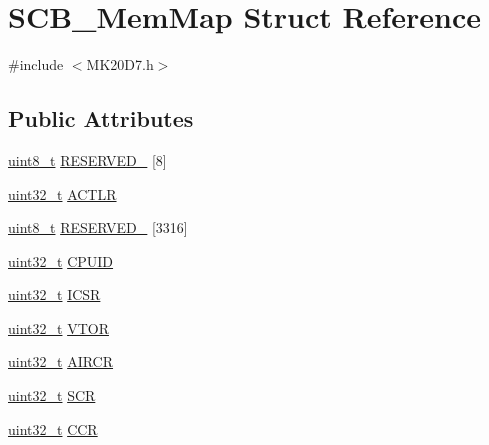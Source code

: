 \hypertarget{struct_s_c_b___mem_map}{}\section{S\+C\+B\+\_\+\+Mem\+Map Struct Reference}
\label{struct_s_c_b___mem_map}


{\ttfamily \#include $<$M\+K20\+D7.\+h$>$}

\subsection*{Public Attributes}
\begin{DoxyCompactItemize}
\item 
\hyperlink{_p_e___types_8h_aba7bc1797add20fe3efdf37ced1182c5}{uint8\+\_\+t} \hyperlink{struct_s_c_b___mem_map_af7bf3148523b4393be4bbefcfca42536}{R\+E\+S\+E\+R\+V\+E\+D\+\_} \mbox{[}8\mbox{]}
\item 
\hyperlink{_p_e___types_8h_a33594304e786b158f3fb30289278f5af}{uint32\+\_\+t} \hyperlink{struct_s_c_b___mem_map_a474a33074611146734690e48ed41282e}{A\+C\+T\+LR}
\item 
\hyperlink{_p_e___types_8h_aba7bc1797add20fe3efdf37ced1182c5}{uint8\+\_\+t} \hyperlink{struct_s_c_b___mem_map_a43cc7c47828036be100191e7ebd7115b}{R\+E\+S\+E\+R\+V\+E\+D\+\_} \mbox{[}3316\mbox{]}
\item 
\hyperlink{_p_e___types_8h_a33594304e786b158f3fb30289278f5af}{uint32\+\_\+t} \hyperlink{struct_s_c_b___mem_map_ad020795dcc3605b4c828af83df8b8836}{C\+P\+U\+ID}
\item 
\hyperlink{_p_e___types_8h_a33594304e786b158f3fb30289278f5af}{uint32\+\_\+t} \hyperlink{struct_s_c_b___mem_map_aafbaa0d0a4b79969877c9b84be8aaf7a}{I\+C\+SR}
\item 
\hyperlink{_p_e___types_8h_a33594304e786b158f3fb30289278f5af}{uint32\+\_\+t} \hyperlink{struct_s_c_b___mem_map_aa327db1d9948595498fba43acc8d336b}{V\+T\+OR}
\item 
\hyperlink{_p_e___types_8h_a33594304e786b158f3fb30289278f5af}{uint32\+\_\+t} \hyperlink{struct_s_c_b___mem_map_a3f874ca1c6e17ae4beadac22e8ec17ec}{A\+I\+R\+CR}
\item 
\hyperlink{_p_e___types_8h_a33594304e786b158f3fb30289278f5af}{uint32\+\_\+t} \hyperlink{struct_s_c_b___mem_map_ac8d0a0d974bde944d42429065dd2f44a}{S\+CR}
\item 
\hyperlink{_p_e___types_8h_a33594304e786b158f3fb30289278f5af}{uint32\+\_\+t} \hyperlink{struct_s_c_b___mem_map_aa6e957027d8c505047cd58101bb784aa}{C\+CR}

\end{DoxyCompactItemize}
